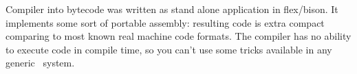 \clearpage{}\label{ucompiler}

Compiler into bytecode was written as stand alone application in flex/bison. It
implements some sort of portable assembly: resulting code is extra compact
comparing to most known real machine code formats. The compiler has no ability
to execute code in compile time, so you can't use some tricks available in
any generic \F\ system.
